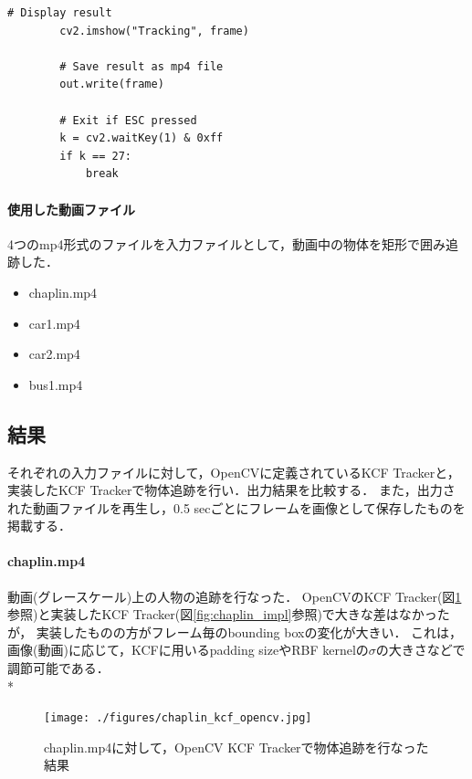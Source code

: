 \documentclass[11pt,a4j]{jarticle}
\begin{document}
\begin{lstlisting}[basicstyle=\ttfamily\footnotesize, frame=single]
        # Display result
        cv2.imshow("Tracking", frame)

        # Save result as mp4 file
        out.write(frame)

        # Exit if ESC pressed
        k = cv2.waitKey(1) & 0xff
        if k == 27:
            break
      \end{lstlisting}

      \paragraph{使用した動画ファイル}
      
      4つのmp4形式のファイルを入力ファイルとして，動画中の物体を矩形で囲み追跡した．

      \begin{itemize}
        \item chaplin.mp4
        \item car1.mp4
        \item car2.mp4
        \item bus1.mp4
      \end{itemize}

    \subsection{結果}
    
    それぞれの入力ファイルに対して，OpenCVに定義されているKCF Trackerと，実装したKCF Trackerで物体追跡を行い．出力結果を比較する．
    また，出力された動画ファイルを再生し，0.5 secごとにフレームを画像として保存したものを掲載する．

    \paragraph{chaplin.mp4}
    動画(グレースケール)上の人物の追跡を行なった．
    OpenCVのKCF Tracker(図\ref{fig:chaplin_opencv}参照)と実装したKCF Tracker(図\ref{fig:chaplin_impl}参照)で大きな差はなかったが，
    実装したものの方がフレーム毎のbounding boxの変化が大きい．
    これは，画像(動画)に応じて，KCFに用いるpadding sizeやRBF kernelの$\sigma$の大きさなどで調節可能である．
    \\*

    \begin{figure}[hbtp]
      \begin{center}
        \texttt{[image: ./figures/chaplin\_kcf\_opencv.jpg]}
        \caption{chaplin.mp4に対して，OpenCV KCF Trackerで物体追跡を行なった結果}
        \label{fig:chaplin_opencv}
      \end{center}
    \end{figure}
\end{document}
